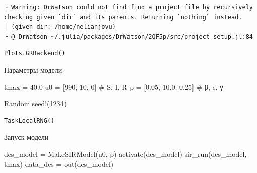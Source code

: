 \documentclass[
  12pt,
  a4paper,
  DIV=11,
  numbers=noendperiod]{scrreprt}
\newenvironment{Shaded}{\begin{snugshade}}{\end{snugshade}}
\newcommand{\BuiltInTok}[1]{\textcolor[rgb]{0.00,0.23,0.31}{#1}}
\newcommand{\CommentTok}[1]{\textcolor[rgb]{0.37,0.37,0.37}{#1}}
\newcommand{\FloatTok}[1]{\textcolor[rgb]{0.68,0.00,0.00}{#1}}
\newcommand{\FunctionTok}[1]{\textcolor[rgb]{0.28,0.35,0.67}{#1}}
\newcommand{\NormalTok}[1]{\textcolor[rgb]{0.00,0.23,0.31}{#1}}
\newcommand{\OperatorTok}[1]{\textcolor[rgb]{0.37,0.37,0.37}{#1}}
\begin{document}
\begin{verbatim}
┌ Warning: DrWatson could not find find a project file by recursively checking given `dir` and its parents. Returning `nothing` instead.
│ (given dir: /home/nelianjovu)
└ @ DrWatson ~/.julia/packages/DrWatson/2QF5p/src/project_setup.jl:84
\end{verbatim}

\begin{verbatim}
Plots.GRBackend()
\end{verbatim}

Параметры модели

\begin{Shaded}
\begin{Highlighting}[]
\NormalTok{tmax }\OperatorTok{=} \FloatTok{40.0}
\NormalTok{u0 }\OperatorTok{=}\NormalTok{ [}\FloatTok{990}\NormalTok{, }\FloatTok{10}\NormalTok{, }\FloatTok{0}\NormalTok{] }\CommentTok{\# S, I, R}
\NormalTok{p }\OperatorTok{=}\NormalTok{ [}\FloatTok{0.05}\NormalTok{, }\FloatTok{10.0}\NormalTok{, }\FloatTok{0.25}\NormalTok{] }\CommentTok{\# β, c, γ}

\BuiltInTok{Random}\NormalTok{.}\FunctionTok{seed!}\NormalTok{(}\FloatTok{1234}\NormalTok{)}
\end{Highlighting}
\end{Shaded}

\begin{verbatim}
TaskLocalRNG()
\end{verbatim}

Запуск модели

\begin{Shaded}
\begin{Highlighting}[]
\NormalTok{des\_model }\OperatorTok{=} \FunctionTok{MakeSIRModel}\NormalTok{(u0, p)}
\FunctionTok{activate}\NormalTok{(des\_model)}
\FunctionTok{sir\_run}\NormalTok{(des\_model, tmax)}
\NormalTok{data\_des }\OperatorTok{=} \FunctionTok{out}\NormalTok{(des\_model)}
\end{Highlighting}
\end{Shaded}
\end{document}
